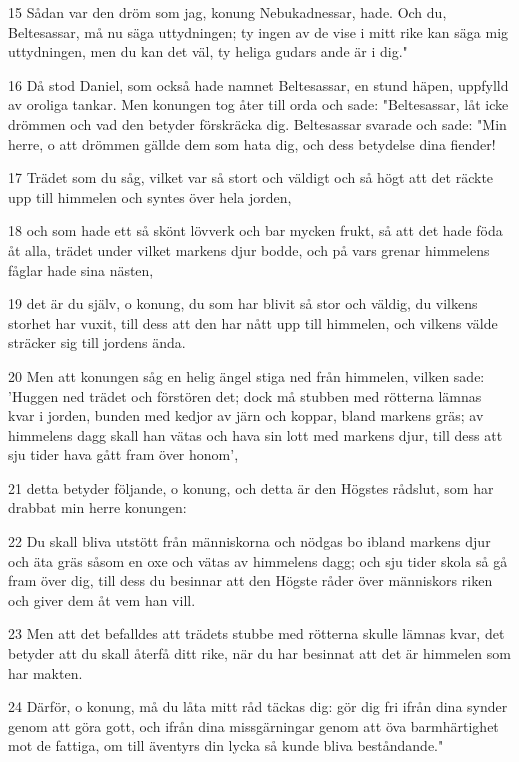 \par 15 Sådan var den dröm som jag, konung Nebukadnessar, hade. Och du, Beltesassar, må nu säga uttydningen; ty ingen av de vise i mitt rike kan säga mig uttydningen, men du kan det väl, ty heliga gudars ande är i dig."
\par 16 Då stod Daniel, som också hade namnet Beltesassar, en stund häpen, uppfylld av oroliga tankar. Men konungen tog åter till orda och sade: "Beltesassar, låt icke drömmen och vad den betyder förskräcka dig. Beltesassar svarade och sade: "Min herre, o att drömmen gällde dem som hata dig, och dess betydelse dina fiender!
\par 17 Trädet som du såg, vilket var så stort och väldigt och så högt att det räckte upp till himmelen och syntes över hela jorden,
\par 18 och som hade ett så skönt lövverk och bar mycken frukt, så att det hade föda åt alla, trädet under vilket markens djur bodde, och på vars grenar himmelens fåglar hade sina nästen,
\par 19 det är du själv, o konung, du som har blivit så stor och väldig, du vilkens storhet har vuxit, till dess att den har nått upp till himmelen, och vilkens välde sträcker sig till jordens ända.
\par 20 Men att konungen såg en helig ängel stiga ned från himmelen, vilken sade: 'Huggen ned trädet och förstören det; dock må stubben med rötterna lämnas kvar i jorden, bunden med kedjor av järn och koppar, bland markens gräs; av himmelens dagg skall han vätas och hava sin lott med markens djur, till dess att sju tider hava gått fram över honom',
\par 21 detta betyder följande, o konung, och detta är den Högstes rådslut, som har drabbat min herre konungen:
\par 22 Du skall bliva utstött från människorna och nödgas bo ibland markens djur och äta gräs såsom en oxe och vätas av himmelens dagg; och sju tider skola så gå fram över dig, till dess du besinnar att den Högste råder över människors riken och giver dem åt vem han vill.
\par 23 Men att det befalldes att trädets stubbe med rötterna skulle lämnas kvar, det betyder att du skall återfå ditt rike, när du har besinnat att det är himmelen som har makten.
\par 24 Därför, o konung, må du låta mitt råd täckas dig: gör dig fri ifrån dina synder genom att göra gott, och ifrån dina missgärningar genom att öva barmhärtighet mot de fattiga, om till äventyrs din lycka så kunde bliva beståndande."
